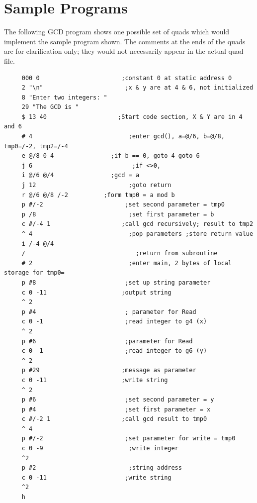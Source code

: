 \documentclass[12pt]{article}
\begin{document}
\section*{Sample Programs}
The following GCD program shows one possible set of quads which would implement the sample program shown. The
comments at the ends of the quads are for clarification only; they would not necessarily appear in the actual quad file.
\begin{verbatim}
     000 0                       ;constant 0 at static address 0
     2 "\n"                       ;x & y are at 4 & 6, not initialized
     8 "Enter two integers: "
     29 "The GCD is "
     $ 13 40                    ;Start code section, X & Y are in 4 and 6
     # 4                           ;enter gcd(), a=@/6, b=@/8, tmp0=/-2, tmp2=/-4
     e @/8 0 4                ;if b == 0, goto 4 goto 6
     j 6                            ;if <>0, 
     i @/6 @/4                ;gcd = a 
     j 12                          ;goto return
     r @/6 @/8 /-2          ;form tmp0 = a mod b
     p #/-2                       ;set second parameter = tmp0
     p /8                          ;set first parameter = b
     c #/-4 1                    ;call gcd recursively; result to tmp2
     ^ 4                           ;pop parameters ;store return value
     i /-4 @/4
     /                               ;return from subroutine
     # 2                           ;enter main, 2 bytes of local storage for tmp0=
     p #8                         ;set up string parameter
     c 0 -11                     ;output string
     ^ 2
     p #4                         ; parameter for Read
     c 0 -1                       ;read integer to g4 (x)
     ^ 2
     p #6                         ;parameter for Read
     c 0 -1                       ;read integer to g6 (y)
     ^ 2
     p #29                       ;message as parameter
     c 0 -11                     ;write string
     ^ 2
     p #6                         ;set second parameter = y
     p #4                         ;set first parameter = x
     c #/-2 1                    ;call gcd result to tmp0
     ^ 4
     p #/-2                       ;set parameter for write = tmp0
     c 0 -9                        ;write integer
     ^2
     p #2                          ;string address
     c 0 -11                      ;write string
     ^2
     h
\end{verbatim}
\end{document}
